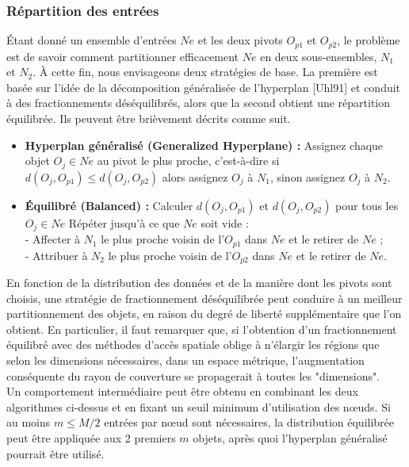 \subsubsection{Répartition des entrées}
Étant donné un ensemble d'entrées $ Ne $ et les deux pivots $ O_{p1} $ et $ O_{p2} $, le problème est de savoir comment partitionner efficacement $ Ne $ en deux sous-ensembles, $  N_1 $ et $ N_2 $. À cette fin, nous envisageons deux stratégies de base. La première est basée sur l'idée de la décomposition généralisée de l'hyperplan [Uhl91] et conduit à des fractionnements déséquilibrés, alors que la second obtient une répartition équilibrée. Ils peuvent être brièvement décrits comme suit.
\begin{itemize}
	\item \textbf{Hyperplan généralisé (Generalized Hyperplane) :} Assignez chaque objet $ O_j \in Ne $ au  pivot le plus proche, c'est-à-dire si $ d(O_j, O_{p1}) \le d(O_j, O_{p2}) $ alors assignez $ O_j $ à $ N_1 $, sinon assignez $ O_j $ à $ N_2 $.
	
	\item \textbf{Équilibré (Balanced) :} Calculer $ d(O_j, O_{p1}) $ et $ d(O_j, O_{p2}) $ pour tous les $ O_j \in Ne $ Répéter jusqu'à ce que $ Ne $ soit vide :\\
	 - Affecter à $ N_1 $ le plus proche voisin de l'$ O_{p1} $ dans $ Ne $ et le retirer de $ Ne $ ;\\
	 - Attribuer à $ N_2 $ le plus proche voisin de l'$ O_{p2} $ dans $ Ne $ et le retirer de $ Ne $.
\end{itemize}
En fonction de la distribution des données et de la manière dont les pivots sont choisis, une stratégie de fractionnement déséquilibrée peut conduire à un meilleur partitionnement des objets, en raison du degré de liberté supplémentaire que l'on obtient. En particulier, il faut remarquer que, si l'obtention d'un fractionnement équilibré avec des méthodes d'accès spatiale oblige à n'élargir les régions que selon les dimensions nécessaires, dans un espace métrique, l'augmentation conséquente du rayon de couverture se propagerait à toutes les "dimensions".\\

Un comportement intermédiaire peut être obtenu en combinant les deux algorithmes ci-dessus et en fixant un seuil minimum d'utilisation des nœuds. Si au moins $ m \le M/2 $ entrées par nœud sont nécessaires, la distribution équilibrée peut être appliquée aux 2 premiers $ m $ objets, après quoi l'hyperplan généralisé pourrait être utilisé. 

